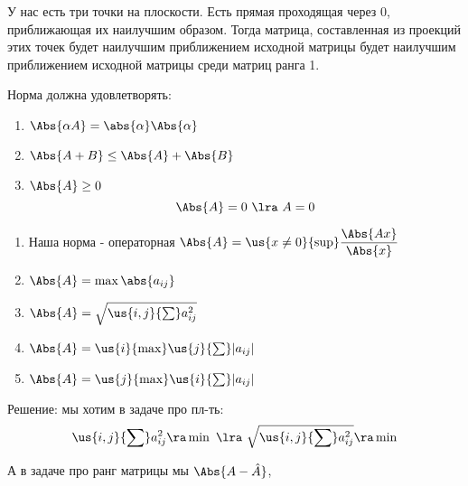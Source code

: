 \documentclass[12pt, fleqn]{article}
\begin{document}
    \begin{task}
        У нас есть три точки на плоскости. Есть прямая проходящая через 0, приближающая их наилучшим образом. Тогда матрица, составленная из проекций этих точек будет наилучшим приближением исходной матрицы будет наилучшим приближением исходной матрицы среди матриц ранга 1.

        Норма должна удовлетворять:
        \begin{enumerate}
          \item $\Abs{\alpha A} = \abs{\alpha} \Abs{\alpha}$
          \item $\Abs{A + B} \leq \Abs{A} + \Abs{B}$
          \item $\Abs{A} \geq 0$
          \[\Abs{A} = 0 \ \lra\ A = 0\]
        \end{enumerate}

        \begin{enumerate}
          \item Наша норма - операторная $\Abs{A} = \us{x \neq 0}{\sup} \dfrac{\Abs{Ax}}{\Abs{x}}$
          \item $\Abs{A} = \max \abs{a_{ij}}$
          \item $\Abs{A} = \sqrt{\us{i,j}{\sum} a_{ij}^2}$
          \item $\Abs{A} = \us{i}{\max} \us{j}{\sum} |a_{ij}|$
          \item $\Abs{A} = \us{j}{\max} \us{i}{\sum} |a_{ij}|$
        \end{enumerate}

        Решение: мы хотим в задаче про пл-ть:\\
        \[\us{i,j}{\sum} a_{ij}^2 \ra \min \ \lra \ \sqrt{\us{i,j}{\sum} a_{ij}^2} \ra \min\]

        А в задаче про ранг матрицы мы $\Abs{A - \hat{A}}$,
    \end{task}
\end{document}
